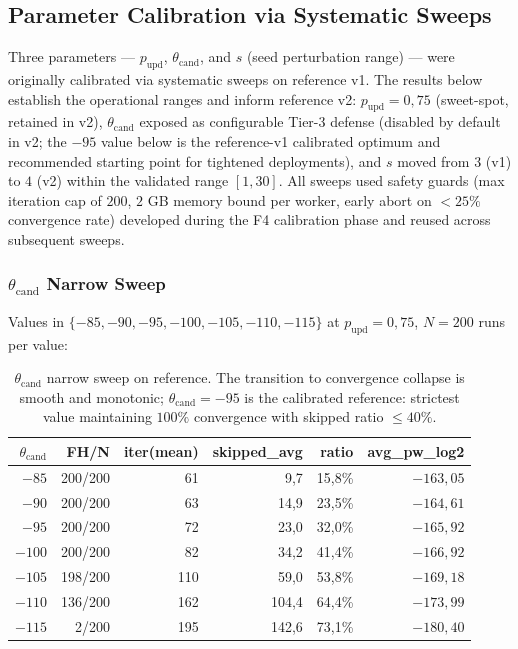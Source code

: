 \documentclass[11pt,a4paper]{article}
\begin{document}
\subsection{Parameter Calibration via Systematic Sweeps}\label{sec:empirical-calibration}

Three parameters --- $p_\text{upd}$, $\theta_{\text{cand}}$, and $s$ (seed perturbation range) --- were originally calibrated via systematic sweeps on reference v1. The results below establish the operational ranges and inform reference v2: $p_\text{upd} = 0{,}75$ (sweet-spot, retained in v2), $\theta_{\text{cand}}$ exposed as configurable Tier-3 defense (disabled by default in v2; the $-95$ value below is the reference-v1 calibrated optimum and recommended starting point for tightened deployments), and $s$ moved from $3$ (v1) to $4$ (v2) within the validated range $[1, 30]$. All sweeps used safety guards (max iteration cap of $200$, $2$ GB memory bound per worker, early abort on $< 25\%$ convergence rate) developed during the F4 calibration phase and reused across subsequent sweeps.

\subsubsection{$\theta_{\text{cand}}$ Narrow Sweep}\label{sec:empirical-cand}

Values in $\{-85, -90, -95, -100, -105, -110, -115\}$ at $p_\text{upd} = 0{,}75$, $N = 200$ runs per value:

\begin{table}[ht]
\centering
\small
\begin{tabular}{rrrrrr}
\toprule
$\theta_{\text{cand}}$ & FH/N & iter(mean) & skipped\_avg & ratio & avg\_pw\_log2 \\
\midrule
$-85$ & 200/200 & 61 & 9{,}7 & 15{,}8\% & $-163{,}05$ \\
$-90$ & 200/200 & 63 & 14{,}9 & 23{,}5\% & $-164{,}61$ \\
$-95$ & 200/200 & 72 & 23{,}0 & 32{,}0\% & $-165{,}92$ \\
$-100$ & 200/200 & 82 & 34{,}2 & 41{,}4\% & $-166{,}92$ \\
$-105$ & 198/200 & 110 & 59{,}0 & 53{,}8\% & $-169{,}18$ \\
$-110$ & 136/200 & 162 & 104{,}4 & 64{,}4\% & $-173{,}99$ \\
$-115$ & 2/200 & 195 & 142{,}6 & 73{,}1\% & $-180{,}40$ \\
\bottomrule
\end{tabular}
\caption{$\theta_{\text{cand}}$ narrow sweep on reference. The transition to convergence collapse is smooth and monotonic; $\theta_{\text{cand}} = -95$ is the calibrated reference: strictest value maintaining $100\%$ convergence with skipped ratio $\leq 40\%$.}
\label{tab:cand-sweep}
\end{table}
\end{document}
